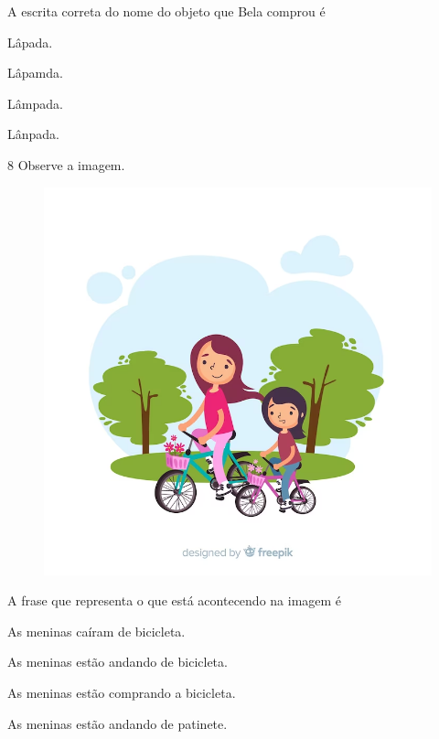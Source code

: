 
A escrita correta do nome do objeto que Bela comprou é

\begin{escolha}
\item Lâpada.

\item Lâpamda.

\item Lâmpada.

\item Lânpada.
\end{escolha}

\num{8} Observe a imagem.

\begin{figure}[htpb!]
\centering
\includegraphics[width=.5\textwidth]{media/image179.png}
\end{figure}


A frase que representa o que está acontecendo na imagem é

\begin{escolha}
\item As meninas caíram de bicicleta.

\item As meninas estão andando de bicicleta.

\item As meninas estão comprando a bicicleta.

\item As meninas estão andando de patinete.
\end{escolha}


